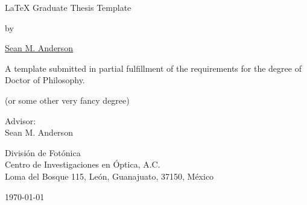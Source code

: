 \begin{titlepage}
\begin{center}
{\Huge \LaTeX{} Graduate Thesis Template}
\vspace{1.0cm}

{\large by}
\vspace{1.0cm}

{\LARGE \href{http://www.roguephysicist.org}{Sean M. Anderson}}
\vspace{3cm}

{\Large A template submitted in partial fulfillment of the requirements for the degree of Doctor of Philosophy.

(or some other very fancy degree)}
\vspace{4cm}

{\large Advisor:\\
Sean M. Anderson
\vspace*{1cm}

Divisi\'on de Fot\'onica\\
Centro de Investigaciones en \'Optica, A.C.\\
Loma del Bosque 115, Le\'on, Guanajuato, 37150, M\'exico}
\vfill
\today
\end{center}
\end{titlepage}
